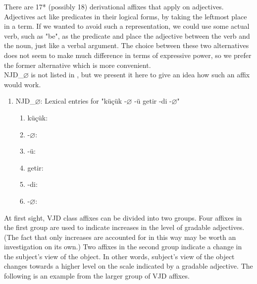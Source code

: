 \documentclass[11pt]{article} %
\begin{document}
There are 17* (possibly 18) derivational affixes that apply on adjectives. Adjectives act like predicates in their logical forms, by taking the leftmost place in a term. If we wanted to avoid such a representation, we could use some actual verb, such as "be", as the predicate and place the adjective between the verb and the noun, just like a verbal argument. The choice between these two alternatives does not seem to make much difference in terms of expressive power, so we prefer the former alternative which is more convenient. \\

NJD\_$\varnothing$ is not listed in \citet{Bozsahin2018}, but we present it here to give an idea how such an affix would work.

\begin{enumerate}[resume*]
	\item NJD\_$\varnothing$: Lexical entries for "küçük -$\varnothing$ -ü getir -di -$\varnothing$"
	\begin{enumerate}[label=(\alph*), ref=(\alph*)]\itemsep1pt
	\item küçük: 
	\item -$\varnothing$: 
	\item -ü: 
	\item getir: 
	\item -di: 
	\item -$\varnothing$: 
	\end{enumerate}
\end{enumerate}

At first sight, VJD class affixes can be divided into two groups. Four affixes in the first group are used to indicate increases in the level of gradable adjectives. (The fact that only increases are accounted for in this way may be worth an investigation on its own.) Two affixes in the second group indicate a change in the subject's view of the object. In other words, subject's view of the object changes towards a higher level on the scale indicated by a gradable adjective. The following is an example from the larger group of VJD affixes.
\end{document}
